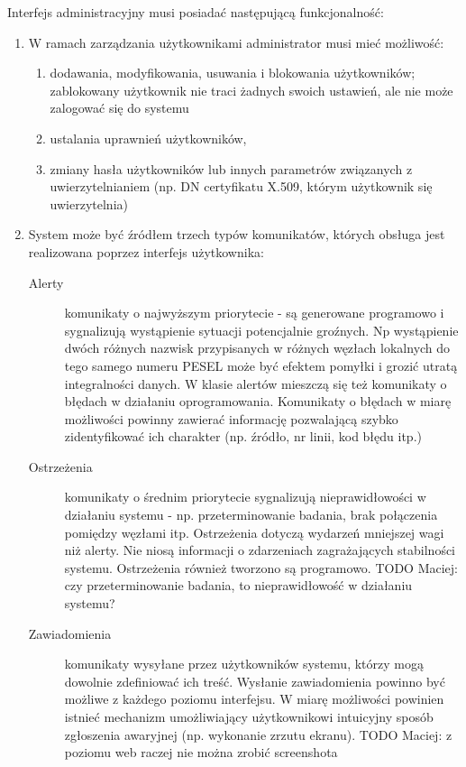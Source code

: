 \documentclass[a4paper]{report}
\begin{document}
\begin{enumerate}
Interfejs administracyjny musi posiadać następującą funkcjonalność:
\begin{enumerate}
  \item W ramach zarządzania użytkownikami administrator musi mieć możliwość:
    \begin{enumerate}
      \item dodawania, modyfikowania, usuwania i blokowania użytkowników; zablokowany użytkownik nie traci
      żadnych swoich ustawień, ale nie może zalogować się do systemu
      \item ustalania uprawnień użytkowników,
      \item zmiany hasła użytkowników lub innych parametrów związanych z uwierzytelnianiem (np. DN certyfikatu X.509, którym użytkownik się uwierzytelnia)
    \end{enumerate}

  \item System może być źródłem trzech typów komunikatów, których obsługa jest realizowana poprzez interfejs użytkownika:
    \begin{description}
      \item[Alerty] komunikaty o najwyższym priorytecie - są generowane programowo i sygnalizują wystąpienie sytuacji potencjalnie groźnych. Np wystąpienie dwóch różnych nazwisk przypisanych w różnych węzłach lokalnych do tego samego numeru PESEL może być efektem pomyłki i grozić utratą integralności danych. W klasie alertów mieszczą się też komunikaty o błędach w działaniu oprogramowania. Komunikaty o błędach w miarę możliwości powinny zawierać informację pozwalającą szybko zidentyfikować ich charakter (np. źródło, nr linii, kod błędu itp.)

      \item[Ostrzeżenia] komunikaty o średnim priorytecie sygnalizują nieprawidłowości w działaniu systemu - np. przeterminowanie badania, brak połączenia pomiędzy węzłami itp. Ostrzeżenia dotyczą wydarzeń mniejszej wagi niż alerty. Nie niosą informacji o zdarzeniach zagrażających stabilności systemu. Ostrzeżenia również tworzono są programowo. TODO Maciej: czy przeterminowanie badania, to nieprawidłowość w działaniu systemu?

      \item[Zawiadomienia] komunikaty wysyłane przez użytkowników systemu, którzy mogą dowolnie zdefiniować ich treść. Wysłanie zawiadomienia powinno być możliwe z każdego poziomu interfejsu. W miarę możliwości powinien istnieć mechanizm umożliwiający użytkownikowi intuicyjny sposób zgłoszenia awaryjnej (np. wykonanie zrzutu ekranu). TODO Maciej: z poziomu web raczej nie można zrobić screenshota
    \end{description}


\end{enumerate}
\end{enumerate}
\end{document}
